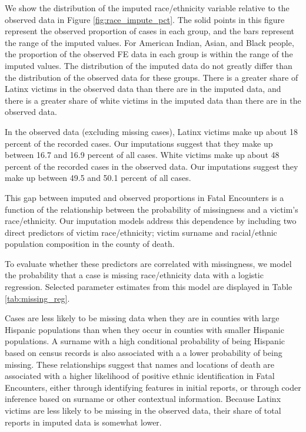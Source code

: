 \documentclass[9pt,twoside,lineno]{pnas-new}
\begin{document}
We show the distribution of the imputed race/ethnicity variable relative to the observed data in Figure \ref{fig:race_impute_pct}. The solid points in this figure represent the observed proportion of cases in each group, and the bars represent the range of the imputed values. For American Indian, Asian, and Black people, the proportion of the observed FE data in each group is within the range of the imputed values. The distribution of the imputed data do not greatly differ than the distribution of the observed data for these groups. There is a greater share of Latinx victims in the observed data than there are in the imputed data, and there is a greater share of white victims in the imputed data than there are in the observed data. 

In the observed data (excluding missing cases), Latinx victims make up about 18 percent of the recorded cases. Our imputations suggest that they make up between 16.7 and 16.9 percent of all cases. White victims make up about 48 percent of the recorded cases in the observed data. Our imputations suggest they make up between 49.5 and 50.1 percent of all cases. 

This gap between imputed and observed proportions in Fatal Encounters is a function of the relationship between the probability of missingness and a victim's race/ethnicity. Our imputation models address this dependence by including two direct predictors of victim race/ethnicity; victim surname and racial/ethnic population composition in the county of death. 

To evaluate whether these predictors are correlated with missingness, we model the probability that a case is missing race/ethnicity data with a logistic regression. Selected parameter estimates from this model are displayed in Table \ref{tab:missing_reg}. 



Cases are less likely to be missing data when they are in counties with large Hispanic populations than when they occur in counties with smaller Hispanic populations. A surname with a high conditional probability of being Hispanic based on census records is also associated with a a lower probability of being missing. These relationships suggest that names and locations of death are associated with a higher likelihood of positive ethnic identification in Fatal Encounters, either through identifying features in initial reports, or through coder inference based on surname or other contextual information. Because Latinx victims are less likely to be missing in the observed data, their share of total reports in imputed data is somewhat lower. 
\end{document}
